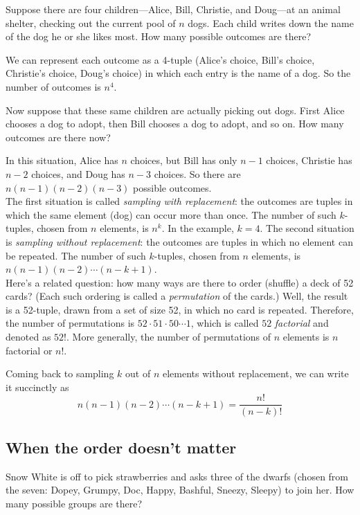 \documentclass{report}
\theoremstyle{plain}
\theoremstyle{definition}
\begin{document}
Suppose there are four children---Alice, Bill, Christie, and Doug---at an animal
shelter, checking out the current pool of $n$ dogs. Each child writes down the 
name of the dog he or she likes most. How many possible outcomes are there?

We can represent each outcome as a 4-tuple (Alice's choice, Bill's choice,
Christie's choice, Doug's choice) in which each entry is the name of a dog. 
So the number of outcomes is $n^4$.

Now suppose that these same children are actually picking out dogs. First Alice 
chooses a dog to adopt, then Bill chooses a dog to adopt, and so on. How many 
outcomes are there now?

In this situation, Alice has $n$ choices, but Bill has only $n-1$ choices,
Christie has $n-2$ choices, and Doug has $n-3$ choices. So there are
$n(n-1)(n-2)(n-3)$ possible outcomes.\\

The first situation is called {\it sampling with replacement}: the
outcomes are tuples in which the same element (dog) can occur more
than once. The number of such $k$-tuples, chosen from $n$ elements, is
$n^k$. In the example, $k=4$. The second situation is {\it sampling
  without replacement}: the outcomes are tuples in which no element
can be repeated. The number of such $k$-tuples, chosen from $n$
elements, is $n(n-1)(n-2) \cdots (n-k+1)$. \\

Here's a related question: how many ways are there to order (shuffle)
a deck of 52 cards?  (Each such ordering is called a {\it permutation}
of the cards.) Well, the result is a 52-tuple, drawn from a set of
size 52, in which no card is repeated. Therefore, the number of
permutations is $52 \cdot 51 \cdot 50 \cdots 1$, which is called $52$
{\em factorial} and denoted as $52!$. More generally, the number of
permutations of $n$ elements is $n$ factorial or $n!$.

Coming back to sampling $k$ out of $n$ elements without replacement,
we can write it succinctly as 
\[
n(n-1)(n-2) \cdots (n-k+1) = \frac{n!}{(n-k)!}
\]

\subsection{When the order doesn't matter}

Snow White is off to pick strawberries and asks three of the dwarfs (chosen 
from the seven: Dopey, Grumpy, Doc, Happy, Bashful, Sneezy, Sleepy) to join 
her. How many possible groups are there?
\end{document}
